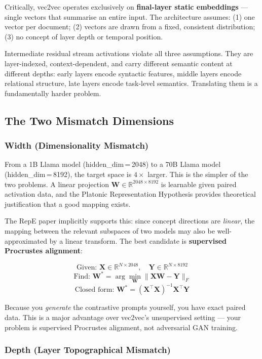 \documentclass[11pt, a4paper]{article}
\begin{document}
Critically, vec2vec operates exclusively on \textbf{final-layer static
embeddings} --- single vectors that summarise an entire input. The architecture
assumes: (1) one vector per document; (2) vectors are drawn from a fixed,
consistent distribution; (3) no concept of layer depth or temporal position.

Intermediate residual stream activations violate all three assumptions. They
are layer-indexed, context-dependent, and carry different semantic content at
different depths: early layers encode syntactic features, middle layers encode
relational structure, late layers encode task-level semantics. Translating them
is a fundamentally harder problem.

\subsection{The Two Mismatch Dimensions}

\subsubsection{Width (Dimensionality Mismatch)}

From a 1B Llama model (hidden\_dim\,=\,2048) to a 70B Llama model
(hidden\_dim\,=\,8192), the target space is $4\times$ larger. This is the
simpler of the two problems. A linear projection
$\mathbf{W} \in \mathbb{R}^{2048 \times 8192}$ is learnable given paired
activation data, and the Platonic Representation Hypothesis provides
theoretical justification that a good mapping exists.

The RepE paper implicitly supports this: since concept directions are
\emph{linear}, the mapping between the relevant subspaces of two models may
also be well-approximated by a linear transform. The best candidate is
\textbf{supervised Procrustes alignment}:

\[
  \text{Given: } \mathbf{X} \in \mathbb{R}^{N \times 2048}, \quad
  \mathbf{Y} \in \mathbb{R}^{N \times 8192}
\]
\[
  \text{Find: } \mathbf{W}^* = \arg\min_{\mathbf{W}} \|\mathbf{X}\mathbf{W} - \mathbf{Y}\|_F
\]
\[
  \text{Closed form: } \mathbf{W}^* = (\mathbf{X}^\top \mathbf{X})^{-1} \mathbf{X}^\top \mathbf{Y}
\]

Because you \emph{generate} the contrastive prompts yourself, you have exact
paired data. This is a major advantage over vec2vec's unsupervised setting ---
your problem is supervised Procrustes alignment, not adversarial GAN training.

\subsubsection{Depth (Layer Topographical Mismatch)}
\end{document}
